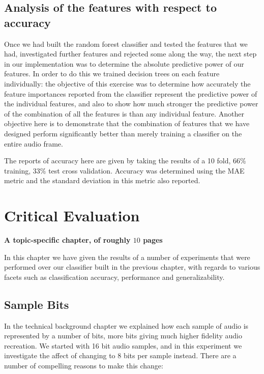 \documentclass[ %
                    author={Sam Phippen},
                supervisor={Dr. Rafal Bogacz},
                     title={Real time voice activity detectors in noisy personal computing environments},
                  subtitle={},
                    degree={MEng},
                      year={2012} ]{thesis}
\begin{document}
\section{Analysis of the features with respect to accuracy}

Once we had built the random forest classifier and tested the features that we
had, investigated further features and rejected some along the way, the next
step in our implementation was to determine the absolute predictive power of
our features. In order to do this we trained decision trees on each feature
individually: the objective of this exercise was to determine how accurately
the feature importances reported from the classifier represent the predictive
power of the individual features, and also to show how much stronger the
predictive power of the combination of all the features is than any individual
feature. Another objective here is to demonstrate that the combination of
features that we have designed perform significantly better than merely
training a classifier on the entire audio frame.

The reports of accuracy here are given by taking the results of a 10 fold, 66\%
training, 33\% test cross validation. Accuracy was determined using the MAE
metric and the standard deviation in this metric also reported.


\chapter{Critical Evaluation}
\label{chap:evaluation}

{\bf A topic-specific chapter, of roughly $10$ pages}
\vspace{1cm}

In this chapter we have given the results of a number of experiments that were
performed over our classifier built in the previous chapter, with regards to
various facets such as classification accuracy, performance and
generalizability.

\section{Sample Bits}

In the technical background chapter we explained how each sample of audio is
represented by a number of bits, more bits giving much higher fidelity audio
recreation. We started with 16 bit audio samples, and in this experiment we
investigate the affect of changing to 8 bits per sample instead. There are a
number of compelling reasons to make this change:
\end{document}
